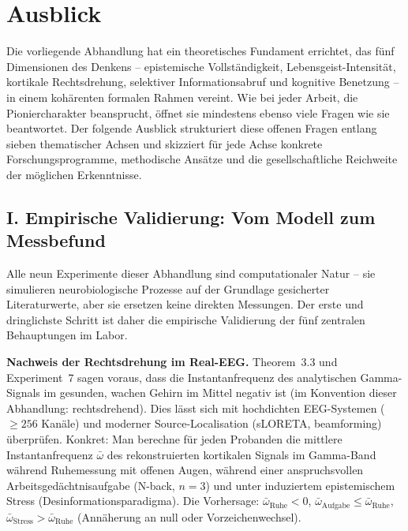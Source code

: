 ﻿\documentclass[12pt,a4paper]{report}
\theoremstyle{plain}
\theoremstyle{definition}
\theoremstyle{remark}
\begin{document}
	\section{Ausblick}

	Die vorliegende Abhandlung hat ein theoretisches Fundament errichtet,
	das fünf Dimensionen des Denkens -- epistemische Vollständigkeit,
	Lebensgeist-Intensität, kortikale Rechtsdrehung, selektiver Informationsabruf
	und kognitive Benetzung -- in einem kohärenten formalen Rahmen vereint.
	Wie bei jeder Arbeit, die Pioniercharakter beansprucht, öffnet sie
	mindestens ebenso viele Fragen wie sie beantwortet.
	Der folgende Ausblick strukturiert diese offenen Fragen entlang
	sieben thematischer Achsen und skizziert für jede Achse
	konkrete Forschungsprogramme, methodische Ansätze und
	die gesellschaftliche Reichweite der möglichen Erkenntnisse.

	\subsection*{I. Empirische Validierung: Vom Modell zum Messbefund}

	Alle neun Experimente dieser Abhandlung sind computationaler Natur --
	sie simulieren neurobiologische Prozesse auf der Grundlage
	gesicherter Literaturwerte, aber sie ersetzen keine direkten Messungen.
	Der erste und dringlichste Schritt ist daher die empirische
	Validierung der fünf zentralen Behauptungen im Labor.

	\textbf{Nachweis der Rechtsdrehung im Real-EEG.}
	Theorem~3.3 und Experiment~7 sagen voraus, dass die Instantanfrequenz
	des analytischen Gamma-Signals im gesunden, wachen Gehirn im Mittel
	negativ ist (im Konvention dieser Abhandlung: rechtsdrehend).
	Dies lässt sich mit hochdichten EEG-Systemen ($\geq 256$ Kanäle)
	und moderner Source-Localisation (sLORETA, beamforming) überprüfen.
	Konkret: Man berechne für jeden Probanden die mittlere
	Instantanfrequenz $\bar{\omega}$ des rekonstruierten kortikalen
	Signals im Gamma-Band während Ruhemessung mit offenen Augen,
	während einer anspruchsvollen Arbeitsgedächtnisaufgabe (N-back, $n=3$)
	und unter induziertem epistemischem Stress (Desinformationsparadigma).
	Die Vorhersage: $\bar{\omega}_{\text{Ruhe}} < 0$,
	$\bar{\omega}_{\text{Aufgabe}} \leq \bar{\omega}_{\text{Ruhe}}$,
	$\bar{\omega}_{\text{Stress}} > \bar{\omega}_{\text{Ruhe}}$
	(Annäherung an null oder Vorzeichenwechsel).
\end{document}
